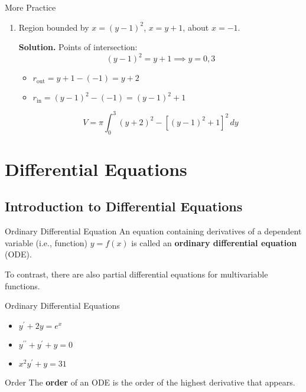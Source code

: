 \begin{Example}{More Practice}{}
\begin{enumerate}[label=(\roman*)]
        \item Region bounded by $ x=(y-1)^2 $, $ x=y+1 $, about $ x=-1 $.

              \textbf{Solution.} Points of intersection:
              \[ (y-1)^2=y+1\implies y=0,3 \]
              \begin{itemize}
                  \item $ r_{\text{out}}=y+1-(-1)=y+2 $
                  \item $ r_{\text{in}}=(y-1)^2-(-1)=(y-1)^2+1 $
              \end{itemize}
              \[ V=\pi \int_{0}^{3} (y+2)^2-\left[ (y-1)^2+1 \right]^2\, d{y}  \]
    \end{enumerate}
\end{Example}

\chapter{Differential Equations}
\section{Introduction to Differential Equations}
\begin{Definition}{Ordinary Differential Equation}{}
    An equation containing derivatives of a dependent variable (i.e., function) $ y=f(x) $
    is called an \textbf{ordinary differential equation} (ODE).
\end{Definition}

\begin{Remark}{}{}
    To contrast, there are also partial differential equations for multivariable functions.
\end{Remark}

\begin{Example}{Ordinary Differential Equations}{}
    \begin{itemize}
        \item $ y^\prime+2y=e^x $
        \item $ y^{\prime\prime}+y^\prime+y=0 $
        \item $ x^2y^\prime+y=31 $
    \end{itemize}
\end{Example}

\begin{Definition}{Order}{}
    The \textbf{order} of an ODE is the order of the highest derivative that appears.
\end{Definition}

